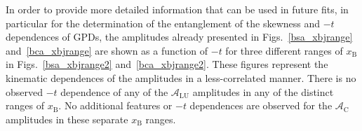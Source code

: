 In order to provide more detailed information that can be used in future fits, in particular for the determination of the entanglement of the skewness and $-t$ dependences of GPDs, the amplitudes already presented in Figs.~\ref{bsa_xbjrange} and~\ref{bca_xbjrange} are shown as a function of $-t$ for three different ranges of $x_{\textrm{B}}$ in Figs.~\ref{bsa_xbjrange2} and~\ref{bca_xbjrange2}. These figures represent the kinematic dependences of the amplitudes in a less-correlated manner. There is no observed $-t$ dependence of any of the $\mathcal{A}_{\textrm{LU}}$ amplitudes in any of the distinct ranges of $x_{\textrm{B}}$. No additional features or $-t$ dependences are observed for the $\mathcal{A}_{\textrm{C}}$ amplitudes in these separate $x_{\textrm{B}}$ ranges.
